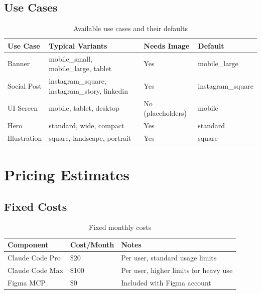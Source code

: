 \documentclass[11pt,a4paper]{article}
\begin{document}
\subsection{Use Cases}

\begin{table}[h]
\centering
\begin{tabular}{@{}llll@{}}
\toprule
\textbf{Use Case} & \textbf{Typical Variants} & \textbf{Needs Image} & \textbf{Default} \\
\midrule
Banner & mobile\_small, mobile\_large, tablet & Yes & mobile\_large \\
Social Post & instagram\_square, instagram\_story, linkedin & Yes & instagram\_square \\
UI Screen & mobile, tablet, desktop & No (placeholders) & mobile \\
Hero & standard, wide, compact & Yes & standard \\
Illustration & square, landscape, portrait & Yes & square \\
\bottomrule
\end{tabular}
\caption{Available use cases and their defaults}
\end{table}

\section{Pricing Estimates}

\subsection{Fixed Costs}

\begin{table}[h]
\centering
\begin{tabular}{@{}llp{6cm}@{}}
\toprule
\textbf{Component} & \textbf{Cost/Month} & \textbf{Notes} \\
\midrule
Claude Code Pro & \$20 & Per user, standard usage limits \\
Claude Code Max & \$100 & Per user, higher limits for heavy use \\
Figma MCP & \$0 & Included with Figma account \\
\bottomrule
\end{tabular}
\caption{Fixed monthly costs}
\end{table}
\end{document}
